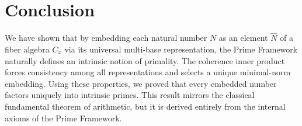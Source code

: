 \documentclass{article}
\begin{document}
\section{Conclusion}
We have shown that by embedding each natural number \(N\) as an element \(\widehat{N}\) of a fiber algebra \(C_x\) via its universal multi-base representation, the Prime Framework naturally defines an intrinsic notion of primality. The coherence inner product forces consistency among all representations and selects a unique minimal-norm embedding. Using these properties, we proved that every embedded number factors uniquely into intrinsic primes. This result mirrors the classical fundamental theorem of arithmetic, but it is derived entirely from the internal axioms of the Prime Framework.
\end{document}
